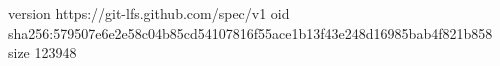version https://git-lfs.github.com/spec/v1
oid sha256:579507e6e2e58c04b85cd54107816f55ace1b13f43e248d16985bab4f821b858
size 123948
